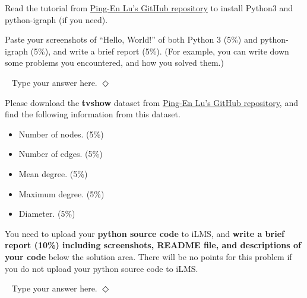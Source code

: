 \documentclass[12pt]{article}
\newcommand {\bsolution}{\noindent {\em Solution:} \ }
\newcommand{\esolution}{\hfill $\Diamond$ \\ \vspace{.3cm}}
\begin{document}
\newpage
Read the tutorial from \href{https://github.com/PingEnLu/Network-Science-COM530500/tree/master/Network_Science_Python_iGraph_Tutorial}{Ping-En Lu's GitHub repository} to install Python3 and python-igraph (if you need).

Paste your screenshots of “Hello, World!” of both Python 3 (5\%) and python-igraph (5\%), and write a brief report (5\%). (For example, you can write down some problems you encountered, and how you solved them.)

\bsolution
Type your answer here.
\esolution

Please download the {\bf tvshow} dataset from \href{https://github.com/PingEnLu/Network-Science-COM530500/tree/master/Network_Science_Python_iGraph_Tutorial}{Ping-En Lu's GitHub repository}, and find the following information from this dataset.

\begin{itemize}
	\item Number of nodes. (5\%)
	\item Number of edges. (5\%)
	\item Mean degree. (5\%)
	\item Maximum degree. (5\%)
	\item Diameter. (5\%)
\end{itemize}
You need to upload your {\bf python source code} to iLMS, and {\bf write a brief report (10\%) including screenshots, README file, and descriptions of your code} below the solution area. There will be no points for this problem if you do not upload your python source code to iLMS.

\bsolution
Type your answer here.
\esolution

\end{document}
